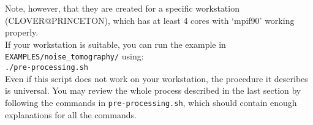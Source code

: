 Note, however, that they are created for a specific workstation (CLOVER@PRINCETON),
which has at least 4 cores with `mpif90' working properly. \\


If your workstation is suitable, you can run the example in \texttt{EXAMPLES/noise\_tomography/}
using:\\

\texttt{./pre-processing.sh}\\


Even if this script does not work on your workstation, the procedure
it describes is universal. You may review the whole process described
in the last section by following the commands in \texttt{pre-processing.sh},
which should contain enough explanations for all the commands.

